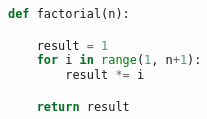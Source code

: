 \begin{lstlisting}[language=Python,label={lst:python-factorielle},title={Factorielle en Python}]
def factorial(n):

    result = 1
    for i in range(1, n+1):
        result *= i

    return result
\end{lstlisting}